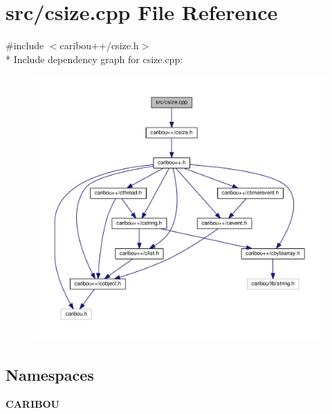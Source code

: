 \section{src/csize.cpp File Reference}
\label{csize_8cpp}
{\ttfamily \#include $<$caribou++/csize.\+h$>$}\\*
Include dependency graph for csize.\+cpp\+:
\nopagebreak
\begin{figure}[H]
\begin{center}
\leavevmode
\includegraphics[width=350pt]{csize_8cpp__incl}
\end{center}
\end{figure}
\subsection*{Namespaces}
\begin{DoxyCompactItemize}
\item 
 {\bf C\+A\+R\+I\+B\+OU}
\end{DoxyCompactItemize}
